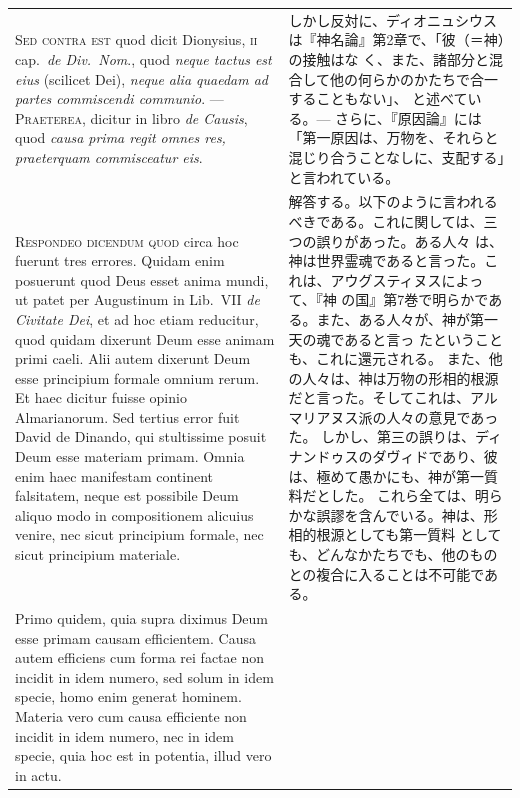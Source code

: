 \documentclass[paper=a4paper,fontsize=10pt,jafontsize=9pt,titlepage]{jlreq}
\begin{document}
\begin{longtable}{p{21em}p{21em}}
\\

{\scshape Sed contra est} quod dicit Dionysius, {\scshape ii} cap.~{\itshape de
 Div.~Nom}., quod {\itshape neque tactus est eius} (scilicet Dei), {\itshape neque alia
 quaedam ad partes commiscendi communio}. ---
{\scshape Praeterea}, dicitur in libro {\itshape de Causis}, quod {\itshape causa prima regit
 omnes res, praeterquam commisceatur eis}.

&

しかし反対に、ディオニュシウスは『神名論』第2章で、「彼（＝神）の接触はな
 く、また、諸部分と混合して他の何らかのかたちで合一することもない」、
 と述べている。---
さらに、『原因論』には「第一原因は、万物を、それらと混じり合うことなしに、支配する」と言われている。


\\




{\scshape Respondeo dicendum quod} circa hoc fuerunt tres
 errores. Quidam enim posuerunt quod Deus esset anima mundi, ut patet
 per Augustinum in Lib.~VII {\itshape de Civitate Dei}, et ad hoc etiam
 reducitur, quod quidam dixerunt Deum esse animam primi caeli.  Alii
 autem dixerunt Deum esse principium formale omnium rerum. Et haec
 dicitur fuisse opinio Almarianorum.  Sed tertius error fuit David de
 Dinando, qui stultissime posuit Deum esse materiam primam.  Omnia enim
 haec manifestam continent falsitatem, neque est possibile Deum aliquo
 modo in compositionem alicuius venire, nec sicut principium formale,
 nec sicut principium materiale.

&

解答する。以下のように言われるべきである。これに関しては、三つの誤りがあった。ある人々
 は、神は世界霊魂であると言った。これは、アウグスティヌスによって、『神
 の国』第7巻で明らかである。また、ある人々が、神が第一天の魂であると言っ
 たということも、これに還元される。
また、他の人々は、神は万物の形相的根源だと言った。そしてこれは、アルマリアヌス派の人々の意見であった。
しかし、第三の誤りは、ディナンドゥスのダヴィドであり、彼は、極めて愚かにも、神が第一質料だとした。
これら全ては、明らかな誤謬を含んでいる。神は、形相的根源としても第一質料
 としても、どんなかたちでも、他のものとの複合に入ることは不可能である。

\\

Primo quidem, quia supra diximus Deum esse primam causam
 efficientem. Causa autem efficiens cum forma rei factae non incidit in
 idem numero, sed solum in idem specie, homo enim generat
 hominem. Materia vero cum causa efficiente non incidit in idem numero,
 nec in idem specie, quia hoc est in potentia, illud vero in actu. 


\end{longtable}
\end{document}
